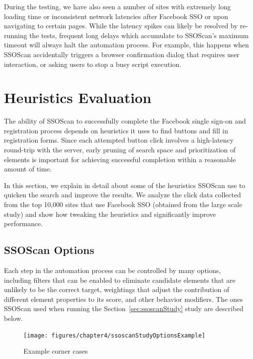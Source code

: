  During the testing, we have also seen a number of sites with extremely long loading time or inconsistent network latencies after Facebook SSO or upon navigating to certain pages.  While the latency spikes can likely be resolved by re-running the tests, frequent long delays which accumulate to SSOScan's maximum timeout will always halt the automation process.  For example, this happens when SSOScan accidentally triggers a browser confirmation dialog that requires user interaction, or asking users to stop a busy script execution.


\section{Heuristics Evaluation}
\label{sec:ssoscanHeuristics}

The ability of SSOScan to successfully complete the Facebook single sign-on and registration process depends on heuristics it uses to find buttons and fill in registration forms.  Since each attempted button click involves a high-latency round-trip with the server, early pruning of search space and prioritization of elements is important for achieving successful completion within a reasonable amount of time.

In this section, we explain in detail about some of the heuristics SSOScan use to quicken the search and improve the results.  We analyze the click data collected from the top 10,000 sites that use Facebook SSO (obtained from the large scale study) and show how tweaking the heuristics and significantly improve performance.

\subsection{SSOScan Options}
\label{sec:ssoscanHeuristicsOptions}

Each step in the automation process can be controlled by many options, including filters that can be enabled to eliminate candidate elements that are unlikely to be the correct target, weightings that adjust the contribution of different element properties to its score, and other behavior modifiers.  The ones SSOScan used when running the Section~\ref{sec:ssoscanStudy} study are described below.

\begin{figure}[hbt]
\centering
\texttt{[image: figures/chapter4/ssoscanStudyOptionsExample]}
\caption{Example corner cases}
\label{fig:ssoscanStudyOptionsExample}
\end{figure}

